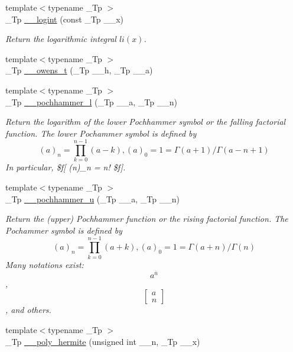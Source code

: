\begin{DoxyCompactItemize}
{\footnotesize template$<$typename \+\_\+\+Tp $>$ }\\\+\_\+\+Tp \hyperlink{namespacestd_1_1____detail_a4d5f8cb2b4e6e192faba9418ec14149f}{\+\_\+\+\_\+logint} (const \+\_\+\+Tp \+\_\+\+\_\+x)
\begin{DoxyCompactList}\small\item\em Return the logarithmic integral $ li(x) $. \end{DoxyCompactList}\item 
{\footnotesize template$<$typename \+\_\+\+Tp $>$ }\\\+\_\+\+Tp \hyperlink{namespacestd_1_1____detail_a5b50a9d8beaca5a637c8293ab01bf124}{\+\_\+\+\_\+owens\+\_\+t} (\+\_\+\+Tp \+\_\+\+\_\+h, \+\_\+\+Tp \+\_\+\+\_\+a)
\item 
{\footnotesize template$<$typename \+\_\+\+Tp $>$ }\\\+\_\+\+Tp \hyperlink{namespacestd_1_1____detail_a475c47b66346d11f519b43abb775e08a}{\+\_\+\+\_\+pochhammer\+\_\+l} (\+\_\+\+Tp \+\_\+\+\_\+a, \+\_\+\+Tp \+\_\+\+\_\+n)
\begin{DoxyCompactList}\small\item\em Return the logarithm of the lower Pochhammer symbol or the falling factorial function. The lower Pochammer symbol is defined by \[ (a)_n = \prod_{k=0}^{n-1} (a - k), (a)_0 = 1 = \Gamma(a + 1) / \Gamma(a - n + 1) \] In particular, \$f\mbox{[} (n)\+\_\+n = n! \$f\mbox{]}. \end{DoxyCompactList}\item 
{\footnotesize template$<$typename \+\_\+\+Tp $>$ }\\\+\_\+\+Tp \hyperlink{namespacestd_1_1____detail_a42b5087ba4f30827767c1e733037f042}{\+\_\+\+\_\+pochhammer\+\_\+u} (\+\_\+\+Tp \+\_\+\+\_\+a, \+\_\+\+Tp \+\_\+\+\_\+n)
\begin{DoxyCompactList}\small\item\em Return the (upper) Pochhammer function or the rising factorial function. The Pochammer symbol is defined by \[ (a)_n = \prod_{k=0}^{n-1} (a + k), (a)_0 = 1 = \Gamma(a + n) / \Gamma(n) \] Many notations exist\+: \[ a^{\overline{n}} \], \[ \left[ \begin{array}{c} a \\ n \end{array} \right] \], and others. \end{DoxyCompactList}\item 
{\footnotesize template$<$typename \+\_\+\+Tp $>$ }\\\+\_\+\+Tp \hyperlink{namespacestd_1_1____detail_aca2f5400ce1d8ee26b9e0e9da74bda2c}{\+\_\+\+\_\+poly\+\_\+hermite} (unsigned int \+\_\+\+\_\+n, \+\_\+\+Tp \+\_\+\+\_\+x)

\end{DoxyCompactItemize}

